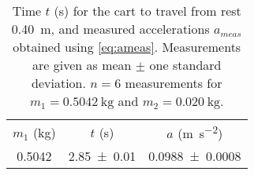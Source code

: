 \begin{table}
\caption{\label{tab:newtable1} Time $t$ (\unit{\second}) for the cart to travel from rest \qty{0.40}{\meter}, and measured accelerations $a_{meas}$ obtained using \cref{eq:ameas}. Measurements are given as mean $\pm$ one standard deviation. $n=6$ measurements for $m_1=\qty{0.5042}{\kilo\gram}$ and $m_2=\qty{0.020}{\kilo\gram}$.}
\begin{center}
\begin{ruledtabular}
\begin{tabular}{ccc}
$m_1$ (\unit{\kilo\gram}) & $t$ (\unit{\second}) & $a$ (\unit{\meter\per\second\squared}) \\ 
\colrule
\num{0.5042} & \num{2.85\pm0.01} & \num{0.0988\pm0.0008} \\ 
\end{tabular}
\end{ruledtabular}
\end{center}
\end{table}
